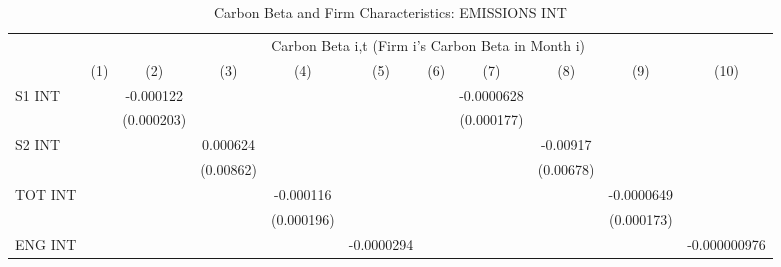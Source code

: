 \begin{table}[htbp]\centering
\def\sym#1{\ifmmode^{#1}\else\(^{#1}\)\fi}
\caption{Carbon Beta and Firm Characteristics: EMISSIONS INT}
\begin{tabular}{l*{10}{c}}
\hline\hline
                &\multicolumn{10}{c}{Carbon Beta i,t (Firm i's Carbon Beta in Month i)}                                                                                                                       \\\cmidrule(lr){2-11}
                &\multicolumn{1}{c}{(1)}         &\multicolumn{1}{c}{(2)}         &\multicolumn{1}{c}{(3)}         &\multicolumn{1}{c}{(4)}         &\multicolumn{1}{c}{(5)}         &\multicolumn{1}{c}{(6)}         &\multicolumn{1}{c}{(7)}         &\multicolumn{1}{c}{(8)}         &\multicolumn{1}{c}{(9)}         &\multicolumn{1}{c}{(10)}         \\
\hline
S1 INT          &                  &-0.000122         &                  &                  &                  &                  &-0.0000628         &                  &                  &                  \\
                &                  &(0.000203)         &                  &                  &                  &                  &(0.000177)         &                  &                  &                  \\
S2 INT          &                  &                  & 0.000624         &                  &                  &                  &                  & -0.00917         &                  &                  \\
                &                  &                  &(0.00862)         &                  &                  &                  &                  &(0.00678)         &                  &                  \\
TOT INT         &                  &                  &                  &-0.000116         &                  &                  &                  &                  &-0.0000649         &                  \\
                &                  &                  &                  &(0.000196)         &                  &                  &                  &                  &(0.000173)         &                  \\
ENG INT         &                  &                  &                  &                  &-0.0000294         &                  &                  &                  &                  &-0.000000976         \\

\end{tabular}
\end{table}
